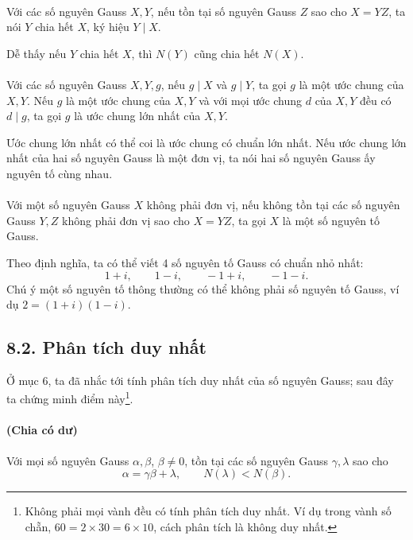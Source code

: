 \documentclass[11pt]{article}
\begin{document}
\paragraph{}
Với các số nguyên Gauss \(X,Y\), nếu tồn tại số nguyên Gauss \(Z\) sao cho
\(X=YZ\), ta nói \(Y\) chia hết \(X\), ký hiệu \(Y\mid X\).

Dễ thấy nếu \(Y\) chia hết \(X\), thì \(N(Y)\) cũng chia hết \(N(X)\).

\paragraph{}
Với các số nguyên Gauss \(X,Y,g\), nếu \(g\mid X\) và \(g\mid Y\), ta gọi
\(g\) là một ước chung của \(X,Y\). Nếu \(g\) là một ước chung của \(X,Y\) và
với mọi ước chung \(d\) của \(X,Y\) đều có \(d\mid g\), ta gọi \(g\) là ước
chung lớn nhất của \(X,Y\).

Ước chung lớn nhất có thể coi là ước chung có chuẩn lớn nhất. Nếu ước chung lớn
nhất của hai số nguyên Gauss là một đơn vị, ta nói hai số nguyên Gauss ấy
nguyên tố cùng nhau.

\paragraph{}
Với một số nguyên Gauss \(X\) không phải đơn vị, nếu không tồn tại các số
nguyên Gauss \(Y,Z\) không phải đơn vị sao cho \(X=YZ\), ta gọi \(X\) là một
số nguyên tố Gauss.

Theo định nghĩa, ta có thể viết 4 số nguyên tố Gauss có chuẩn nhỏ nhất:
\[
  1+i,\qquad 1-i,\qquad -1+i,\qquad -1-i.
\]
Chú ý một số nguyên tố thông thường có thể không phải số nguyên tố Gauss, ví
dụ \(2=(1+i)(1-i)\).

\subsection*{8.2. Phân tích duy nhất}

Ở mục 6, ta đã nhắc tới tính phân tích duy nhất của số nguyên Gauss; sau đây
ta chứng minh điểm này\footnote{Không phải mọi vành đều có tính phân tích duy
nhất. Ví dụ trong vành số chẵn, \(60=2\times30=6\times10\), cách phân tích là
không duy nhất.}.

\paragraph{ (Chia có dư)}
Với mọi số nguyên Gauss \(\alpha,\beta\), \(\beta\ne0\), tồn tại các số nguyên
Gauss \(\gamma,\lambda\) sao cho
\[
  \alpha=\gamma\beta+\lambda,\qquad N(\lambda)<N(\beta).
\]
\end{document}
